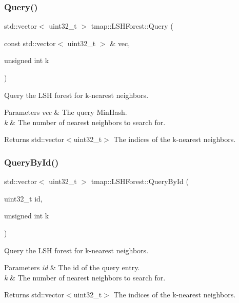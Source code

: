 \subsubsection{\texorpdfstring{Query()}{Query()}}
{\footnotesize\ttfamily std\+::vector$<$ uint32\+\_\+t $>$ tmap\+::\+L\+S\+H\+Forest\+::\+Query (\begin{DoxyParamCaption}\item[{const std\+::vector$<$ uint32\+\_\+t $>$ \&}]{vec,  }\item[{unsigned int}]{k }\end{DoxyParamCaption})}



Query the L\+SH forest for k-\/nearest neighbors. 


\begin{DoxyParams}{Parameters}
{\em vec} & The query Min\+Hash. \\
\hline
{\em k} & The number of nearest neighbors to search for. \\
\hline
\end{DoxyParams}
\begin{DoxyReturn}{Returns}
std\+::vector$<$uint32\+\_\+t$>$ The indices of the k-\/nearest neighbors. 
\end{DoxyReturn}
\mbox{\label{classtmap_1_1LSHForest_aa200b72cc60947e5e03fd72ea726a999}} 
\subsubsection{\texorpdfstring{Query\+By\+Id()}{QueryById()}}
{\footnotesize\ttfamily std\+::vector$<$ uint32\+\_\+t $>$ tmap\+::\+L\+S\+H\+Forest\+::\+Query\+By\+Id (\begin{DoxyParamCaption}\item[{uint32\+\_\+t}]{id,  }\item[{unsigned int}]{k }\end{DoxyParamCaption})}



Query the L\+SH forest for k-\/nearest neighbors. 


\begin{DoxyParams}{Parameters}
{\em id} & The id of the query entry. \\
\hline
{\em k} & The number of nearest neighbors to search for. \\
\hline
\end{DoxyParams}
\begin{DoxyReturn}{Returns}
std\+::vector$<$uint32\+\_\+t$>$ The indices of the k-\/nearest neighbors. 
\end{DoxyReturn}
\mbox{\label{classtmap_1_1LSHForest_a7aba9b1df0273b71ed2d9233d05ed0db}} 
